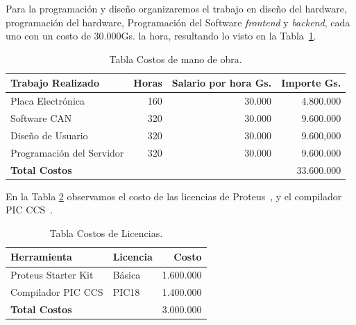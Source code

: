 Para la programación  y diseño organizaremos el trabajo en diseño del hardware, programación del hardware, Programación del Software \textit{frontend} y \textit{backend}, cada uno con un costo de 30.000Gs. la hora, resultando lo visto en la Tabla~\ref{tabla:software}. 

\begin{table}[H]
\begin{center}
\begin{tabular}{l r r r}
\toprule
\textbf{Trabajo Realizado} & \textbf{Horas}&\textbf{Salario por hora Gs.} & \textbf{Importe Gs.} \\ \hline

 Placa Electrónica & 160 & 30.000  & 4.800.000     \\ 
 Software CAN      & 320 & 30.000  & 9.600.000     \\ 
 Diseño de Usuario & 320 & 30.000  & 9.600,000     \\ 
 Programación del Servidor & 320 & 30.000 & 9.600.000 \\ 
 \textbf{ Total Costos} &  & & 33.600.000 \\ %
\bottomrule
\end{tabular}
\caption{Tabla Costos de mano de obra.}
\label{tabla:software}
\end{center}
\end{table}



En la Tabla \ref{tabla:licencias} observamos el costo de las licencias de Proteus~\cite{licenp}, y el compilador PIC CCS~\cite{pic_ccs}.
\begin{table}[H]
\begin{center}
\begin{tabular}{l l r }
\toprule
\textbf{Herramienta} & \textbf{Licencia} & \textbf{Costo}  \\ 
\midrule
Proteus Starter Kit  & Básica & 1.600.000  \\ 
Compilador PIC CCS   & PIC18  & 1.400.000  \\ 
\textbf{Total Costos} &  &   3.000.000     \\ \bottomrule
\end{tabular}
\caption{Tabla Costos de Licencias.}
\label{tabla:licencias}
\end{center}
\end{table}


